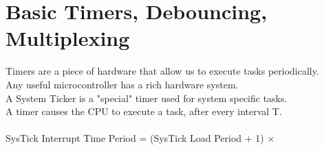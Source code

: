 \documentclass[nobib]{tufte-handout}
\begin{document}
\section{Basic Timers, Debouncing, Multiplexing}
Timers are a piece of hardware that allow us to execute tasks periodically.\\
Any useful microcontroller has a rich hardware system.\\
A System Ticker is a "special" timer used for system specific tasks.\\
A timer causes the CPU to execute a task, after every interval T.\\~\\


SysTick Interrupt Time Period = (SysTick Load Period + 1) $\times$ 
\end{document}
